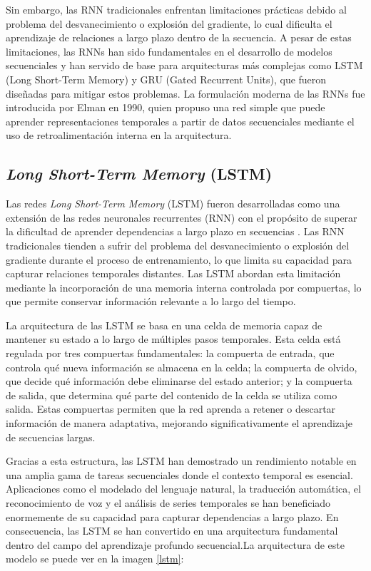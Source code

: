 Sin embargo, las RNN tradicionales enfrentan limitaciones 
prácticas debido al problema del desvanecimiento o explosión 
del gradiente, lo cual dificulta el aprendizaje de relaciones 
a largo plazo dentro de la secuencia. A pesar de estas 
limitaciones, las RNNs han sido fundamentales en el 
desarrollo de modelos secuenciales y han servido de base para 
arquitecturas más complejas como LSTM (Long Short-Term Memory) 
y GRU (Gated Recurrent Units), que fueron diseñadas para 
mitigar estos problemas. La formulación moderna de las RNNs 
fue introducida por Elman en 1990\cite{elman1990finding}, 
quien propuso una red simple que puede aprender 
representaciones temporales a partir de datos secuenciales 
mediante el uso de retroalimentación interna en la 
arquitectura.

\subsection{\textit{Long Short-Term Memory} (LSTM)}

Las redes \textit{Long Short-Term Memory} (LSTM) fueron 
desarrolladas como una extensión de las redes neuronales 
recurrentes (RNN) con el propósito de superar la dificultad 
de aprender dependencias a largo plazo en secuencias
\cite{hochreiter1997lstm}. Las 
RNN tradicionales tienden a sufrir del problema del 
desvanecimiento o explosión del gradiente durante el 
proceso de entrenamiento, lo que limita su capacidad 
para capturar relaciones temporales distantes. Las LSTM 
abordan esta limitación mediante la incorporación de una 
memoria interna controlada por compuertas, lo que permite 
conservar información relevante a lo largo del tiempo.

La arquitectura de las LSTM se basa en una celda de memoria 
capaz de mantener su estado a lo largo de múltiples pasos 
temporales. Esta celda está regulada por tres compuertas 
fundamentales: la compuerta de entrada, que controla qué 
nueva información se almacena en la celda; la compuerta 
de olvido, que decide qué información debe eliminarse 
del estado anterior; y la compuerta de salida, que 
determina qué parte del contenido de la celda se utiliza 
como salida. Estas compuertas permiten que la red aprenda a 
retener o descartar información de manera adaptativa, mejorando 
significativamente el aprendizaje de secuencias largas.

Gracias a esta estructura, las LSTM han demostrado un 
rendimiento notable en una amplia gama de tareas secuenciales 
donde el contexto temporal es esencial. Aplicaciones como 
el modelado del lenguaje natural, la traducción automática, 
el reconocimiento de voz y el análisis de series temporales 
se han beneficiado enormemente de su capacidad para capturar 
dependencias a largo plazo. En consecuencia, las LSTM se han 
convertido en una arquitectura fundamental dentro del campo 
del aprendizaje profundo secuencial.La arquitectura de este modelo se puede ver en la imagen 
\ref{lstm}:

